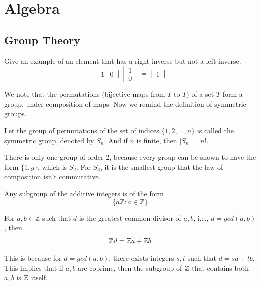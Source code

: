 \chapter{Algebra}

\section{Group Theory}
\begin{example}
    Give an example of an element that has a right inverse but not a left inverse.
    \begin{equation*}
        \begin{bmatrix}
            1&0
        \end{bmatrix}\begin{bmatrix}
            1\\
            0
        \end{bmatrix}=\begin{bmatrix}
            1
        \end{bmatrix}
    \end{equation*}
\end{example}
We note that the permutations (bijective maps from $T$ to $T$) of a set $T$ form a group, under composition of maps. Now we remind the definition of symmetric groups.
\begin{defn}
    Let the group of permutations of the set of indices $\{1,2, \ldots, n\}$ is called the symmetric group, denoted by $S_n$. And if $n$ is finite, then $|S_n|=n!$.
\end{defn}
There is only one group of order 2, because every group can be shown to have the form $\{1, g\}$, which is $S_2$. For $S_3$, it is the smallest group that the law of composition isn't commutative.

\begin{prop}
    Any subgroup of the additive integers is of the form 
    \begin{equation*}
        \{a\mathbb{Z}: a\in\mathbb{Z}\}
    \end{equation*}
\end{prop}
\begin{prop}
    For $a,b\in\mathbb{Z}$ such that $d$ is the greatest common divisor of $a,b$, i.e., $d=gcd(a,b)$, then 
\begin{equation*}
    \mathbb{Z} d=\mathbb{Z} a+\mathbb{Z} b
\end{equation*}
\end{prop}
This is because for $d=gcd(a,b)$, there exists integers $s,t$ such that $d=sa+tb$. This implies that if $a,b$ are coprime, then the subgroup of $\mathbb{Z}$ that contains both $a,b$ is $\mathbb{Z}$ itself.

